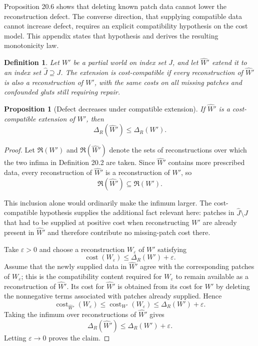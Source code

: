 \documentclass[11pt]{book}
\newtheorem*{appendixdefinition}{Definition}
\newtheorem*{appendixproposition}{Proposition}
\begin{document}
Proposition 20.6 shows that deleting known patch data cannot lower the
reconstruction defect. The converse direction, that supplying compatible
data cannot increase defect, requires an explicit compatibility
hypothesis on the cost model. This appendix states that hypothesis and
derives the resulting monotonicity law.

\begin{appendixdefinition}
Let $W'$ be a partial world on index set $J$, and let
$\widehat W'$ extend it to an index set $\widehat J\supseteq J$.
The extension is \emph{cost-compatible} if every reconstruction of
$\widehat W'$ is also a reconstruction of $W'$, with the same costs on
all missing patches and confounded gluts still requiring repair.
\end{appendixdefinition}

\begin{appendixproposition}[Defect decreases under compatible extension]
If $\widehat W'$ is a cost-compatible extension of $W'$, then
\[
\Delta_R(\widehat W')
\leq
\Delta_R(W').
\]
\end{appendixproposition}

\begin{proof}
Let $\mathfrak R(W')$ and $\mathfrak R(\widehat W')$ denote the sets of
reconstructions over which the two infima in Definition 20.2 are taken.
Since $\widehat W'$ contains more prescribed data, every reconstruction
of $\widehat W'$ is a reconstruction of $W'$, so
\[
\mathfrak R(\widehat W')
\subseteq
\mathfrak R(W').
\]

This inclusion alone would ordinarily make the infimum larger. The
cost-compatible hypothesis supplies the additional fact relevant here:
patches in $\widehat J\setminus J$ that had to be supplied at positive
cost when reconstructing $W'$ are already present in $\widehat W'$ and
therefore contribute no missing-patch cost there.

Take $\varepsilon>0$ and choose a reconstruction $W_\varepsilon$ of
$W'$ satisfying
\[
\operatorname{cost}(W_\varepsilon)
\leq
\Delta_R(W')+\varepsilon.
\]
Assume that the newly supplied data in $\widehat W'$ agree with the
corresponding patches of $W_\varepsilon$; this is the compatibility
content required for $W_\varepsilon$ to remain available as a
reconstruction of $\widehat W'$. Its cost for $\widehat W'$ is obtained
from its cost for $W'$ by deleting the nonnegative terms associated with
patches already supplied. Hence
\[
\operatorname{cost}_{\widehat W'}(W_\varepsilon)
\leq
\operatorname{cost}_{W'}(W_\varepsilon)
\leq
\Delta_R(W')+\varepsilon.
\]
Taking the infimum over reconstructions of $\widehat W'$ gives
\[
\Delta_R(\widehat W')
\leq
\Delta_R(W')+\varepsilon.
\]
Letting $\varepsilon\to0$ proves the claim.
\end{proof}
\end{document}
